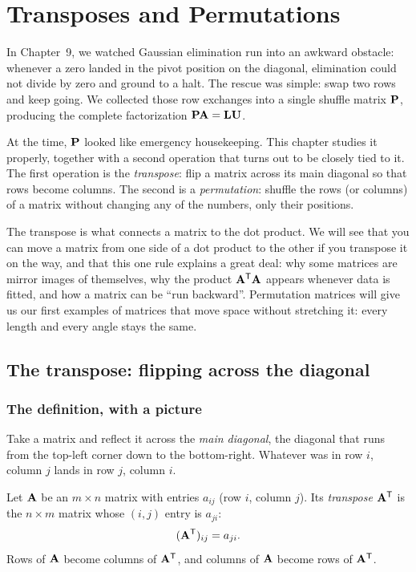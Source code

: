\chapter{Transposes and Permutations}

In Chapter~9, we watched Gaussian elimination run into an awkward obstacle: whenever
a zero landed in the pivot position on the diagonal, elimination could not divide by zero
and ground to a halt. The rescue was simple: swap two rows and keep going. We collected
those row exchanges into a single shuffle matrix $\mathbf{P}$, producing the complete factorization
$\mathbf{P}\mathbf{A} = \mathbf{L}\mathbf{U}$.

At the time, $\mathbf{P}$ looked like emergency housekeeping. This chapter studies it properly,
together with a second operation that turns out to be closely tied to it. The first operation
is the \emph{transpose}: flip a matrix across its main diagonal so that rows become columns.
The second is a \emph{permutation}: shuffle the rows (or columns) of a matrix without changing
any of the numbers, only their positions.

The transpose is what connects a matrix to the dot product. We will see that you can move a
matrix from one side of a dot product to the other if you transpose it on the way, and that
this one rule explains a great deal: why some matrices are mirror images of themselves, why
the product $\mathbf{A}^{\mathsf{T}}\mathbf{A}$ appears whenever data is fitted, and how a matrix can be ``run
backward''. Permutation matrices will give us our first examples of matrices that move space
without stretching it: every length and every angle stays the same.

\section{The transpose: flipping across the diagonal}

\subsection{The definition, with a picture}

Take a matrix and reflect it across the \emph{main diagonal}, the diagonal that
runs from the top-left corner down to the bottom-right. Whatever was in row $i$, column $j$ lands in
row $j$, column $i$.

\begin{definition}[Transpose]\label{ch10:def-transpose}
Let $\mathbf{A}$ be an $m\times n$ matrix with entries $a_{ij}$ (row $i$, column $j$). Its
\emph{transpose} $\mathbf{A}^{\mathsf{T}}$ is the $n\times m$ matrix whose $(i,j)$ entry is $a_{ji}$:
\[
  (\mathbf{A}^{\mathsf{T}})_{ij} = a_{ji}.
\]
Rows of $\mathbf{A}$ become columns of $\mathbf{A}^{\mathsf{T}}$, and columns of $\mathbf{A}$ become rows of $\mathbf{A}^{\mathsf{T}}$.
\end{definition}

